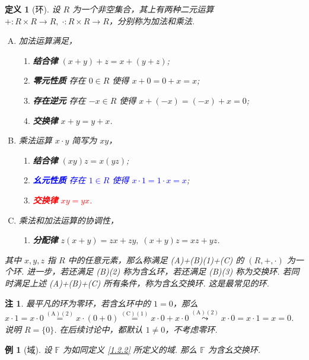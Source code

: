 \documentclass[10pt,openany]{article}
\theoremstyle{thmstyle} %
\theoremstyle{defstyle} %
\newtheorem{definition}[theorem]{定义}
\theoremstyle{prostyle} %
\newtheorem{example}[theorem]{例}
\newtheorem{remark}[theorem]{注}
\begin{document}
\begin{definition}[环]
	设 \( R \) 为一个非空集合，其上有两种二元运算 \( +:R \times R \to R , \; \cdot : R \times R \to R \)，分别称为加法和乘法.
	\begin{enumerate}[(A)]
		\item 加法运算满足，
		\begin{enumerate}[(1)]
			\item \textbf{结合律} \( (x+y)+z=x+(y+z) \);
			\item \textbf{零元性质} 存在 \( 0 \in R \) 使得 \( x+0=0+x=x \);
			\item \textbf{存在逆元} 存在 \( -x \in R \) 使得 \( x+(-x)=(-x)+x=0 \);
			\item \textbf{交换律} \( x+y=y+x \).
		\end{enumerate}
		\item 乘法运算 \( x \cdot y \) 简写为 \( xy \)，
		\begin{enumerate}[(1)]
			\item \textbf{结合律} \( (xy)z=x(yz) \);
			\item \textcolor{blue}{\textbf{幺元性质} 存在 \( 1 \in R \) 使得 \( x \cdot 1=1 \cdot x=x \)};
			\item \textcolor{red}{\textbf{交换律} \( xy=yx \).}
		\end{enumerate}
		\item 乘法和加法运算的协调性，
		\begin{enumerate}[(1)]
			\item \textbf{分配律} \( z(x+y)=zx+zy, \; (x+y)z=xz+yz \).
		\end{enumerate}
	\end{enumerate}
	
	其中 \( x,y,z \) 指 \( R \) 中的任意元素，那么称满足 (A)+(B)(1)+(C) 的 \( (R,+, \cdot) \) 为一个环. 进一步，若还满足 (B)(2) 称为含幺环，若还满足 (B)(3) 称为交换环. 若同时满足上述 (A)+(B)+(C) 所有条件，称为含幺交换环. 这是最常见的环. 
	\label{}
\end{definition}

\begin{remark}
	最平凡的环为零环，若含幺环中的 \( 1=0 \)，那么 \( x \cdot 1= x \cdot 0 \overset{(\text{A})(2)}{=} x \cdot (0+0) \overset{(\text{C})(1)}{=} x \cdot 0+ x \cdot 0 \overset{(\text{A})(2)}{\leadsto} x \cdot 0=x \cdot 1=x=0 \). 说明 \( R=\{0\} \). 在后续讨论中，都默认 \( 1 \neq 0 \)，不考虑零环.
\end{remark}

\begin{example}[域]
	设 \( \mathbb{F} \) 为如同定义 \ref{1.2.2} 所定义的域. 那么 \( \mathbb{F} \) 为含幺交换环. 
\end{example}
\end{document}
